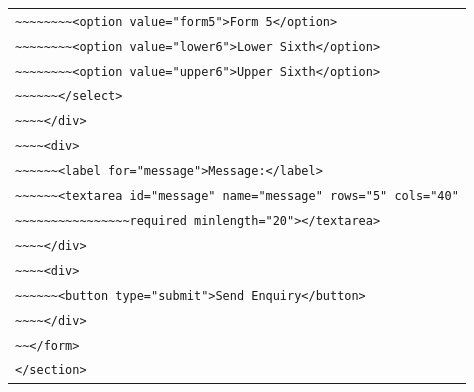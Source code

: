 \documentclass[11pt]{article}
\begin{document}
\begin{center}
\begin{tabular}{l}
\texttt{\textasciitilde{}\textasciitilde{}\textasciitilde{}\textasciitilde{}\textasciitilde{}\textasciitilde{}\textasciitilde{}\textasciitilde{}<option value="form5">Form 5</option>} \\
\texttt{\textasciitilde{}\textasciitilde{}\textasciitilde{}\textasciitilde{}\textasciitilde{}\textasciitilde{}\textasciitilde{}\textasciitilde{}<option value="lower6">Lower Sixth</option>} \\
\texttt{\textasciitilde{}\textasciitilde{}\textasciitilde{}\textasciitilde{}\textasciitilde{}\textasciitilde{}\textasciitilde{}\textasciitilde{}<option value="upper6">Upper Sixth</option>} \\
\texttt{\textasciitilde{}\textasciitilde{}\textasciitilde{}\textasciitilde{}\textasciitilde{}\textasciitilde{}</select>} \\
\texttt{\textasciitilde{}\textasciitilde{}\textasciitilde{}\textasciitilde{}</div>} \\
\texttt{\textasciitilde{}\textasciitilde{}\textasciitilde{}\textasciitilde{}<div>} \\
\texttt{\textasciitilde{}\textasciitilde{}\textasciitilde{}\textasciitilde{}\textasciitilde{}\textasciitilde{}<label for="message">Message:</label>} \\
\texttt{\textasciitilde{}\textasciitilde{}\textasciitilde{}\textasciitilde{}\textasciitilde{}\textasciitilde{}<textarea id="message" name="message" rows="5" cols="40"} \\
\texttt{\textasciitilde{}\textasciitilde{}\textasciitilde{}\textasciitilde{}\textasciitilde{}\textasciitilde{}\textasciitilde{}\textasciitilde{}\textasciitilde{}\textasciitilde{}\textasciitilde{}\textasciitilde{}\textasciitilde{}\textasciitilde{}\textasciitilde{}\textasciitilde{}required minlength="20"></textarea>} \\
\texttt{\textasciitilde{}\textasciitilde{}\textasciitilde{}\textasciitilde{}</div>} \\
\texttt{\textasciitilde{}\textasciitilde{}\textasciitilde{}\textasciitilde{}<div>} \\
\texttt{\textasciitilde{}\textasciitilde{}\textasciitilde{}\textasciitilde{}\textasciitilde{}\textasciitilde{}<button type="submit">Send Enquiry</button>} \\
\texttt{\textasciitilde{}\textasciitilde{}\textasciitilde{}\textasciitilde{}</div>} \\
\texttt{\textasciitilde{}\textasciitilde{}</form>} \\
\texttt{</section>}
\end{tabular}
\end{center}
\end{document}

